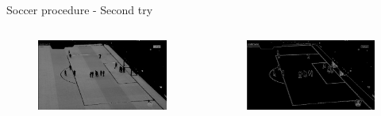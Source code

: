 \documentclass[12pt]{beamer}
\begin{document}
\begin{frame}{Soccer procedure - Second try}
\begin{columns}
{\begin{figure}
            \includegraphics[width=\textwidth]{resources/png/soccer_00020_01.png}
        \end{figure}
        \vspace{-1em}
        \begin{figure}
            \includegraphics[width=\textwidth]{resources/png/soccer_00020_02.png}
        \end{figure}
    }
\end{columns}
\end{frame}
\end{document}
